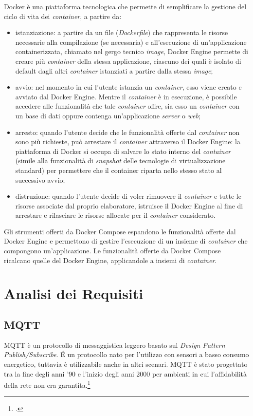 Docker è una piattaforma tecnologica che permette di semplificare la gestione del ciclo di vita dei \emph{container}, a partire da:
\begin{itemize}
	\item istanziazione: a partire da un file (\emph{Dockerfile}) che rappresenta le risorse necessarie alla compilazione (se necessaria) e all'esecuzione di un'applicazione containerizzata, chiamato nel gergo tecnico \emph{image}, Docker Engine permette di creare più \emph{container} della stessa applicazione, ciascuno dei quali è isolato di default dagli altri \emph{container} istanziati a partire dalla stessa \emph{image};
	\item avvio: nel momento in cui l'utente istanzia un \emph{container}, esso viene creato e avviato dal Docker Engine. Mentre il \emph{container} è in esecuzione, è possibile accedere alle funzionalità che tale \emph{container} offre, sia esso un \emph{container} con un base di dati oppure contenga un'applicazione \emph{server} o \emph{web};
	\item arresto: quando l'utente decide che le funzionalità offerte dal \emph{container} non sono più richieste, può arrestare il \emph{container} attraverso il Docker Engine: la piattaforma di Docker si occupa di salvare lo stato interno del \emph{container} (simile alla funzionalità di \emph{snapshot} delle tecnologie di virtualizzazione standard) per permettere che il container riparta nello stesso stato al successivo avvio;
	\item distruzione: quando l'utente decide di voler rimuovere il \emph{container} e tutte le risorse associate dal proprio elaboratore, istruisce il Docker Engine al fine di arrestare e rilasciare le risorse allocate per il \emph{container} considerato.
\end{itemize}
Gli strumenti offerti da Docker Compose espandono le funzionalità offerte dal Docker Engine e permettono di gestire l'esecuzione di un insieme di \emph{container} che compongono un'applicazione. Le funzionalità offerte da Docker Compose ricalcano quelle del Docker Engine, applicandole a insiemi di \emph{container}.

\section{Analisi dei Requisiti}
\label{ar}

\subsection{MQTT}
\label{subsec:mqtt}
\gls{MQTT} è un protocollo di messaggistica leggero basato sul \emph{Design Pattern} \emph{Publish/Subscribe}.
É un protocollo nato per l'utilizzo con sensori a basso consumo energetico, tuttavia è utilizzabile anche in altri scenari.
MQTT è stato progettato tra la fine degli anni '90 e l'inizio degli anni 2000 per ambienti in cui l'affidabilità della rete non era garantita.\footcite{mqtt}

